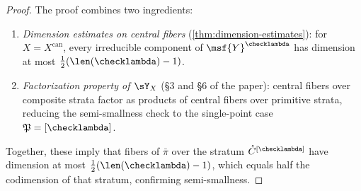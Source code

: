 \begin{proof}
  The proof combines two ingredients:
  \begin{enumerate}
    \item \emph{Dimension estimates on central fibers} (\cref{thm:dimension-estimates}):
          for \( X = X^{\mathrm{can}} \), every irreducible component of
          \( \msf{Y}^{\checklambda} \) has dimension at most
          \( \tfrac{1}{2}(\len(\checklambda)-1) \).
    \item \emph{Factorization property of \( \sY_X \)} (§3 and §6 of the paper):
          central fibers over composite strata factor as products of central fibers
          over primitive strata, reducing the semi-smallness check to the single-point
          case \( \mathfrak{P} = [\checklambda] \).
  \end{enumerate}
  Together, these imply that fibers of \( \bar\pi \) over the stratum
  \( \mathring{C}^{[\checklambda]} \) have dimension at most \( \frac{1}{2}(\len(\checklambda)-1) \),
  which equals half the codimension of that stratum, confirming semi-smallness.
\end{proof}

